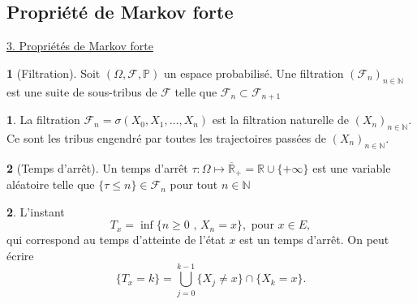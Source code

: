 \documentclass[8pt,notheorems]{beamer}
\def \N{\mathbb N}
\theoremstyle{definition}
\newtheorem{definition}{\translate{Definition}}
\theoremstyle{example}
\newtheorem{example}{\translate{Exemple}}
\theoremstyle{mystyle}
\theoremstyle{plain}
\begin{document}
\subsection{Propriété de Markov forte}
\begin{frame}[allowframebreaks]
\underline{3. Propriétés de Markov forte}
\begin{definition}[Filtration]
Soit $(\Omega,\mathcal{F},\mathbb{P})$ un espace probabilisé. Une filtration $(\mathcal{F}_n)_{n\in\N}$ est une suite de sous-tribus de $\mathcal{F}$ telle que $\mathcal{F}_n\subset\mathcal{F}_{n+1}$
\end{definition}
\begin{example}
La filtration $\mathcal{F}_n=\sigma(X_0,X_1,\ldots,X_n)$ est la filtration naturelle de $(X_n)_{n\in\N}$. Ce sont les tribus engendré par toutes les trajectoires passées de $(X_n)_{n\in\N}$.
\end{example}
\begin{definition}[Temps d'arrêt]
Un temps d'arrêt $\tau:\Omega\mapsto \overline{\mathbb{R}}_+ = \mathbb{R}\cup\{+\infty\}$ est une variable aléatoire telle que $\{\tau\leq n \}\in \mathcal{F}_n$ pour tout $n\in\N$
\end{definition}
\begin{example}
L'instant
$$
T_x = \inf\{n\geq 0\text{ , }X_n = x\},\text{ pour }x\in E,
$$
qui correspond au temps d'atteinte de l'état $x$ est un temps d'arrêt. On peut écrire
$$
\{T_x = k\} = \bigcup_{j = 0}^{k-1}\{X_j \neq x\}\cap \{X_k = x\}.
$$
\end{example}
\end{frame}
\end{document}
